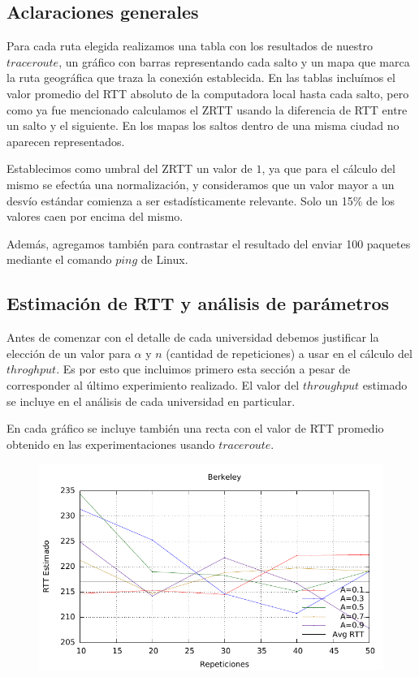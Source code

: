 \subsection{Aclaraciones generales}
 Para cada ruta elegida realizamos una tabla con los resultados de nuestro $traceroute$, un gráfico con barras representando cada salto y un mapa que marca la ruta geográfica que traza la conexión establecida. En las tablas incluímos el valor promedio del RTT absoluto de la computadora local hasta cada salto, pero como ya fue mencionado calculamos el ZRTT usando la diferencia de RTT entre un salto y el siguiente. En los mapas los saltos dentro de una misma ciudad no aparecen representados.
 
 Establecimos como umbral del ZRTT un valor de $1$, ya que para el cálculo del mismo se efectúa una normalización, y consideramos que un valor mayor a un desvío estándar comienza a ser estadísticamente relevante. Solo un 15\% de los valores caen por encima del mismo.
 
 Además, agregamos también para contrastar el resultado del enviar 100 paquetes mediante el comando $ping$ de Linux.
  
\subsection{Estimación de RTT y análisis de parámetros}

Antes de comenzar con el detalle de cada universidad debemos justificar la elección de un valor para $\alpha$ y $n$ (cantidad de repeticiones) a usar en el cálculo del $throghput$. Es por esto que incluimos primero esta sección a pesar de corresponder al último experimiento realizado. El valor del $throughput$ estimado se incluye en el análisis de cada universidad en particular.

En cada gráfico se incluye también una recta con el valor de RTT promedio obtenido en las experimentaciones usando $traceroute$.

\begin{figure}[htp]
 \centering
 \includegraphics[scale=0.80]{imgs/thoughput/berkeley_rtt.pdf}
\end{figure}

